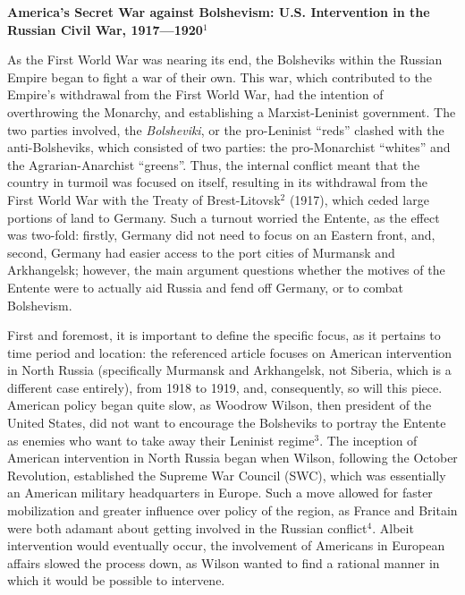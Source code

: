 



\begin{center}

  \textbf{America's Secret War against Bolshevism: U.S. Intervention in the Russian Civil War, 1917—1920}$^1$

\end{center}

\begin{justify}

  \hspace{.5in} As the First World War was nearing its end, the Bolsheviks within the Russian Empire began to fight a war of their own. This war, which contributed to the Empire's withdrawal from the First World War, had the intention of overthrowing the Monarchy, and establishing a Marxist-Leninist government. The two parties involved, the \textit{Bolsheviki}, or the pro-Leninist ``reds'' clashed with the anti-Bolsheviks, which consisted of two parties: the pro-Monarchist ``whites'' and the Agrarian-Anarchist ``greens''. Thus, the internal conflict meant that the country in turmoil was focused on itself, resulting in its withdrawal from the First World War with the Treaty of Brest-Litovsk$^2$ (1917), which ceded large portions of land to Germany. Such a turnout worried the Entente, as the effect was two-fold: firstly, Germany did not need to focus on an Eastern front, and, second, Germany had easier access to the port cities of Murmansk and Arkhangelsk; however, the main argument questions whether the motives of the Entente were to actually aid Russia and fend off Germany, or to combat Bolshevism.

  \hspace{.5in} First and foremost, it is important to define the specific focus, as it pertains to time period and location: the referenced article focuses on American intervention in North Russia (specifically Murmansk and Arkhangelsk, not Siberia, which is a different case entirely), from 1918 to 1919, and, consequently, so will this piece. American policy began quite slow, as Woodrow Wilson, then president of the United States, did not want to encourage the Bolsheviks to portray the Entente as enemies who want to take away their Leninist regime$^3$. The inception of American intervention in North Russia began when Wilson, following the October Revolution, established the Supreme War Council (SWC), which was essentially an American military headquarters in Europe. Such a move allowed for faster mobilization and greater influence over policy of the region, as France and Britain were both adamant about getting involved in the Russian conflict$^4$. Albeit intervention would eventually occur, the involvement of Americans in European affairs slowed the process down, as Wilson wanted to find a rational manner in which it would be possible to intervene.


\end{justify}
